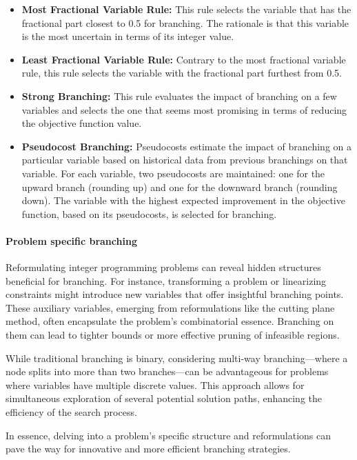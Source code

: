 \begin{itemize}
    \item \textbf{Most Fractional Variable Rule:} This rule selects the variable that has the fractional part closest to 0.5 for branching. The rationale is that this variable is the most uncertain in terms of its integer value.
    
    \item \textbf{Least Fractional Variable Rule:} Contrary to the most fractional variable rule, this rule selects the variable with the fractional part furthest from 0.5.
    
    \item \textbf{Strong Branching:} This rule evaluates the impact of branching on a few variables and selects the one that seems most promising in terms of reducing the objective function value.
    
    \item \textbf{Pseudocost Branching:} Pseudocosts estimate the impact of branching on a particular variable based on historical data from previous branchings on that variable. For each variable, two pseudocosts are maintained: one for the upward branch (rounding up) and one for the downward branch (rounding down). The variable with the highest expected improvement in the objective function, based on its pseudocosts, is selected for branching.
\end{itemize}
\paragraph{Problem specific branching}
Reformulating integer programming problems can reveal hidden structures beneficial for branching. For instance, transforming a problem or linearizing constraints might introduce new variables that offer insightful branching points. These auxiliary variables, emerging from reformulations like the cutting plane method, often encapsulate the problem's combinatorial essence. Branching on them can lead to tighter bounds or more effective pruning of infeasible regions.

While traditional branching is binary, considering multi-way branching—where a node splits into more than two branches—can be advantageous for problems where variables have multiple discrete values. This approach allows for simultaneous exploration of several potential solution paths, enhancing the efficiency of the search process.

In essence, delving into a problem's specific structure and reformulations can pave the way for innovative and more efficient branching strategies.


